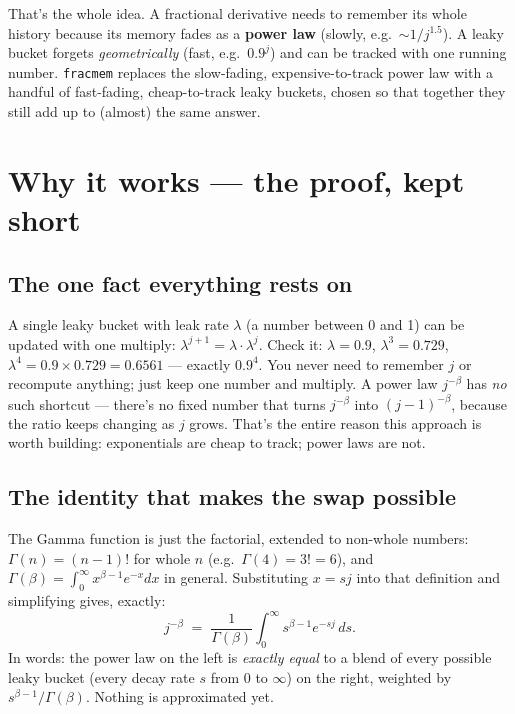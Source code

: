\documentclass[11pt]{article}
\begin{document}
\begin{keyidea}
That's the whole idea. A fractional derivative needs to remember its whole history because its memory fades as a \textbf{power law} (slowly, e.g.\ $\sim 1/j^{1.5}$). A leaky bucket forgets \emph{geometrically} (fast, e.g.\ $0.9^j$) and can be tracked with one running number. \texttt{fracmem} replaces the slow-fading, expensive-to-track power law with a handful of fast-fading, cheap-to-track leaky buckets, chosen so that together they still add up to (almost) the same answer.
\end{keyidea}

\section{Why it works --- the proof, kept short}

\subsection{The one fact everything rests on}
A single leaky bucket with leak rate $\lambda$ (a number between 0 and 1) can be updated with one multiply: $\lambda^{j+1} = \lambda \cdot \lambda^j$. Check it: $\lambda=0.9$, $\lambda^3=0.729$, $\lambda^4 = 0.9\times0.729=0.6561$ --- exactly $0.9^4$. You never need to remember $j$ or recompute anything; just keep one number and multiply. A power law $j^{-\beta}$ has \emph{no} such shortcut --- there's no fixed number that turns $j^{-\beta}$ into $(j{-}1)^{-\beta}$, because the ratio keeps changing as $j$ grows. That's the entire reason this approach is worth building: exponentials are cheap to track; power laws are not.

\subsection{The identity that makes the swap possible}
The Gamma function is just the factorial, extended to non-whole numbers: $\Gamma(n)=(n{-}1)!$ for whole $n$ (e.g.\ $\Gamma(4)=3!=6$), and $\Gamma(\beta)=\int_0^\infty x^{\beta-1}e^{-x}dx$ in general. Substituting $x=sj$ into that definition and simplifying gives, exactly:
\[
j^{-\beta} \;=\; \frac{1}{\Gamma(\beta)}\int_0^\infty s^{\beta-1}e^{-sj}\,ds.
\]
In words: the power law on the left is \emph{exactly equal} to a blend of every possible leaky bucket (every decay rate $s$ from 0 to $\infty$) on the right, weighted by $s^{\beta-1}/\Gamma(\beta)$. Nothing is approximated yet.
\end{document}
